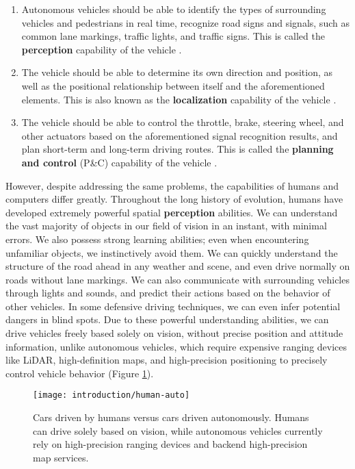 \begin{enumerate}
	\item Autonomous vehicles should be able to identify the types of surrounding vehicles and pedestrians in real time, recognize road signs and signals, such as common lane markings, traffic lights, and traffic signs. This is called the \textbf{perception} capability of the vehicle \cite{Qian2020, Zhang2018}.
	\item The vehicle should be able to determine its own direction and position, as well as the positional relationship between itself and the aforementioned elements. This is also known as the \textbf{localization} capability of the vehicle \cite{Wei2020, Hungar2020, Wang2017}.
	\item The vehicle should be able to control the throttle, brake, steering wheel, and other actuators based on the aforementioned signal recognition results, and plan short-term and long-term driving routes. This is called the \textbf{planning and control} (P\&C) capability of the vehicle \cite{Sun2018, Viana2021}.
\end{enumerate}

However, despite addressing the same problems, the capabilities of humans and computers differ greatly. Throughout the long history of evolution, humans have developed extremely powerful spatial \textbf{perception} abilities. We can understand the vast majority of objects in our field of vision in an instant, with minimal errors. We also possess strong learning abilities; even when encountering unfamiliar objects, we instinctively avoid them. We can quickly understand the structure of the road ahead in any weather and scene, and even drive normally on roads without lane markings. We can also communicate with surrounding vehicles through lights and sounds, and predict their actions based on the behavior of other vehicles. In some defensive driving techniques, we can even infer potential dangers in blind spots. Due to these powerful understanding abilities, we can drive vehicles freely based solely on vision, without precise position and attitude information, unlike autonomous vehicles, which require expensive ranging devices like LiDAR, high-definition maps, and high-precision positioning to precisely control vehicle behavior (Figure \ref{fig:human-auto}).

\begin{figure}[!htp]
	\centering
	\texttt{[image: introduction/human-auto]}
	\caption{Cars driven by humans versus cars driven autonomously. Humans can drive solely based on vision, while autonomous vehicles currently rely on high-precision ranging devices and backend high-precision map services.}
	\label{fig:human-auto}
\end{figure}

